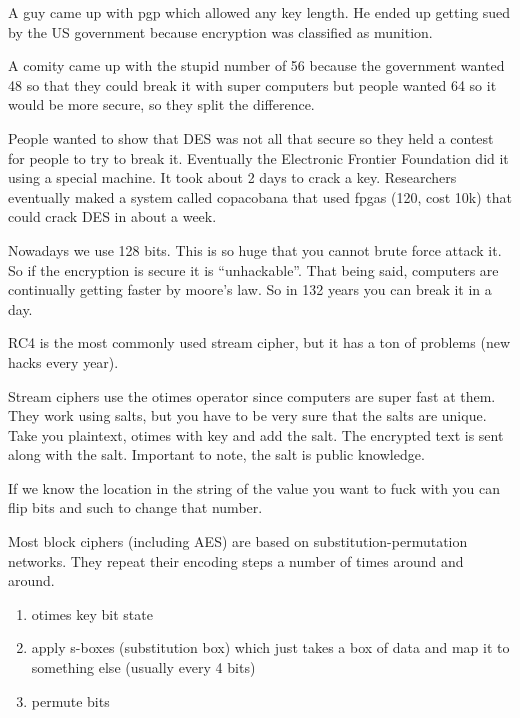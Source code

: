 \documentclass{article}
\begin{document}

A guy came up with pgp which allowed any key length. He ended up getting sued by the US government because encryption was classified as munition.


A comity came up with the stupid number of 56 because the government wanted 48 so that they could break it with super computers but people wanted 64 so it would be more secure, so they split the difference.


People wanted to show that DES was not all that secure so they held a contest for people to try to break it. Eventually the Electronic Frontier Foundation did it using a special machine. It took about 2 days to crack a key. Researchers eventually maked a system called copacobana that used fpgas (120, cost 10k) that could crack DES in about a week.


Nowadays we use 128 bits. This is so huge that you cannot brute force attack it. So if the encryption is secure it is ``unhackable''. That being said, computers are continually getting faster by moore's law. So in 132 years you can break it in a day.






RC4 is the most commonly used stream cipher, but it has a ton of problems (new hacks every year).


Stream ciphers use the otimes operator since computers are super fast at them. They work using salts, but you have to be very sure that the salts are unique. Take you plaintext, otimes with key and add the salt. The encrypted text is sent along with the salt. Important to note, the salt is public knowledge.


If we know the location in the string of the value you want to fuck with you can flip bits and such to change that number.

Most block ciphers (including AES) are based on substitution-permutation networks. They repeat their encoding steps a number of times around and around.
\begin{enumerate}
	\item otimes key bit state
	\item apply s-boxes (substitution box) which just takes a box of data and map it to something else (usually every 4 bits)
	\item permute bits
\end{enumerate}
\end{document}
